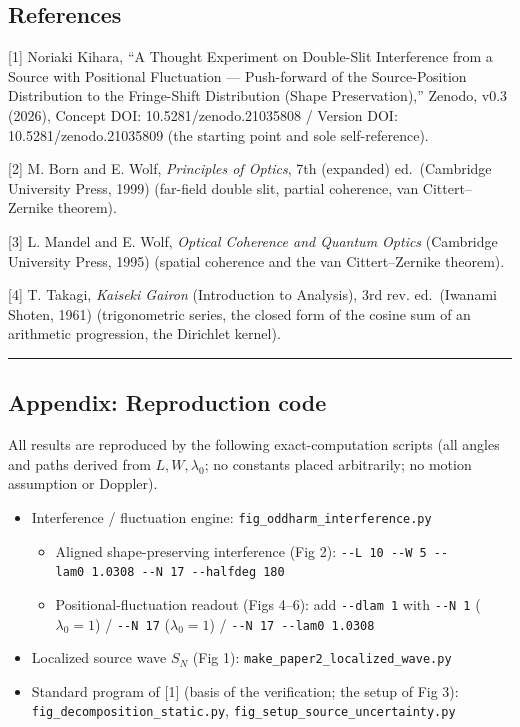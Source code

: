 \documentclass[
]{article}
\providecommand{\tightlist}{%
  \setlength{\itemsep}{0pt}\setlength{\parskip}{0pt}}
\begin{document}
\subsection{References}\label{references}

{[}1{]} Noriaki Kihara, ``A Thought Experiment on Double-Slit
Interference from a Source with Positional Fluctuation --- Push-forward
of the Source-Position Distribution to the Fringe-Shift Distribution
(Shape Preservation),'' Zenodo, v0.3 (2026), Concept DOI:
10.5281/zenodo.21035808 / Version DOI: 10.5281/zenodo.21035809 (the
starting point and sole self-reference).

{[}2{]} M. Born and E. Wolf, \emph{Principles of Optics}, 7th (expanded)
ed.~(Cambridge University Press, 1999) (far-field double slit, partial
coherence, van Cittert--Zernike theorem).

{[}3{]} L. Mandel and E. Wolf, \emph{Optical Coherence and Quantum
Optics} (Cambridge University Press, 1995) (spatial coherence and the
van Cittert--Zernike theorem).

{[}4{]} T. Takagi, \emph{Kaiseki Gairon} (Introduction to Analysis), 3rd
rev. ed.~(Iwanami Shoten, 1961) (trigonometric series, the closed form
of the cosine sum of an arithmetic progression, the Dirichlet kernel).

\begin{center}\rule{0.5\linewidth}{0.5pt}\end{center}

\subsection{Appendix: Reproduction
code}\label{appendix-reproduction-code}

All results are reproduced by the following exact-computation scripts
(all angles and paths derived from \(L,W,\lambda_0\); no constants
placed arbitrarily; no motion assumption or Doppler).

\begin{itemize}
\tightlist
\item
  Interference / fluctuation engine:
  \texttt{fig\_oddharm\_interference.py}

  \begin{itemize}
  \tightlist
  \item
    Aligned shape-preserving interference (Fig 2):
    \texttt{-\/-L\ 10\ -\/-W\ 5\ -\/-lam0\ 1.0308\ -\/-N\ 17\ -\/-halfdeg\ 180}
  \item
    Positional-fluctuation readout (Figs 4--6): add \texttt{-\/-dlam\ 1}
    with \texttt{-\/-N\ 1} (\(\lambda_0=1\)) / \texttt{-\/-N\ 17}
    (\(\lambda_0=1\)) / \texttt{-\/-N\ 17\ -\/-lam0\ 1.0308}
  \end{itemize}
\item
  Localized source wave \(S_N\) (Fig 1):
  \texttt{make\_paper2\_localized\_wave.py}
\item
  Standard program of {[}1{]} (basis of the verification; the setup of
  Fig 3): \texttt{fig\_decomposition\_static.py},
  \texttt{fig\_setup\_source\_uncertainty.py}
\end{itemize}
\end{document}
